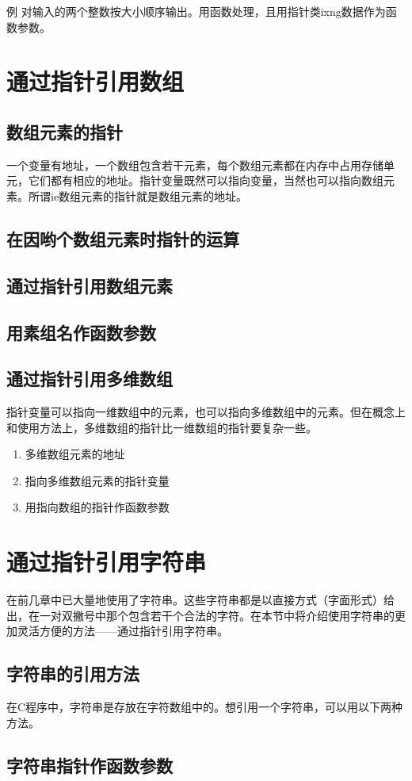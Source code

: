 例 对输入的两个整数按大小顺序输出。用函数处理，且用指针类ixng数据作为函数参数。
\section{通过指针引用数组}
\subsection{数组元素的指针}
一个变量有地址，一个数组包含若干元素，每个数组元素都在内存中占用存储单元，它们都有相应的地址。指针变量既然可以指向变量，当然也可以指向数组元素。所谓ie数组元素的指针就是数组元素的地址。
\subsection{在因哟个数组元素时指针的运算}
\subsection{通过指针引用数组元素}
\subsection{用素组名作函数参数}
\subsection{通过指针引用多维数组}
指针变量可以指向一维数组中的元素，也可以指向多维数组中的元素。但在概念上和使用方法上，多维数组的指针比一维数组的指针要复杂一些。
\begin{enumerate}
	\item 多维数组元素的地址

	\item 指向多维数组元素的指针变量
	\item 用指向数组的指针作函数参数
\end{enumerate}
\section{通过指针引用字符串}
在前几章中已大量地使用了字符串。这些字符串都是以直接方式（字面形式）给出，在一对双撇号中那个包含若干个合法的字符。在本节中将介绍使用字符串的更加灵活方便的方法——通过指针引用字符串。
\subsection{字符串的引用方法}
在C程序中，字符串是存放在字符数组中的。想引用一个字符串，可以用以下两种方法。
\subsection{字符串指针作函数参数}

